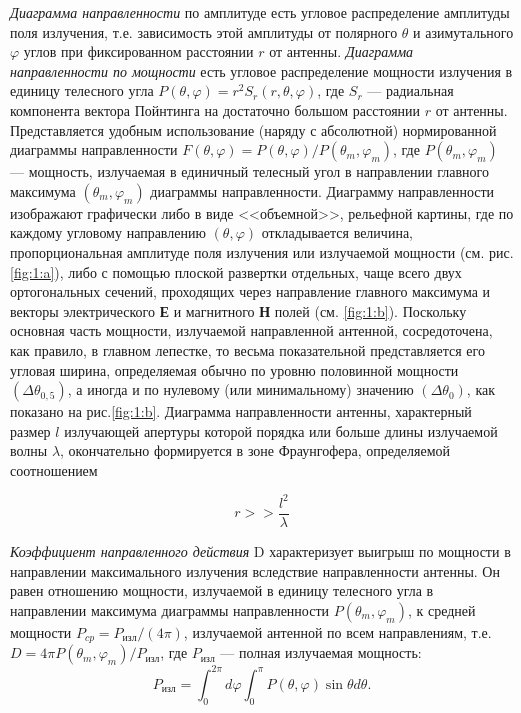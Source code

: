 \textit{Диаграмма направленности} по амплитуде есть угловое распределение амплитуды поля излучения, т.е. зависимость этой
амплитуды от полярного $\theta $ и азимутального $ \varphi $ углов при фиксированном расстоянии $r$ от антенны. \textit{Диаграмма направленности
по мощности} есть угловое распределение мощности излучения в единицу телесного угла $P(\theta, \varphi)=r^{2} S_{r}(r, \theta, \varphi)$,
где $S_{r}$ — радиальная компонента вектора Пойнтинга на достаточно большом расстоянии $r$ от антенны. Представляется 
удобным использование (наряду с абсолютной) нормированной диаграммы направленности $F(\theta,\varphi) = P(\theta,\varphi)/P(\theta_m,\varphi_m)$,
где $P(\theta_m,\varphi_m)$ — мощность, излучаемая в единичный телесный угол в направлении главного максимума $(\theta_m,\varphi_m)$ диаграммы
направленности. Диаграмму направленности изображают графически либо в виде <<объемной>>, рельефной картины, где по
каждому угловому направлению $(\theta,\varphi)$ откладывается величина, пропорциональная амплитуде поля излучения или излучаемой 
мощности (см. рис. \ref{fig:1:a}), либо с помощью плоской развертки отдельных, чаще всего двух ортогональных сечений, проходящих 
через направление главного максимума и векторы электрического \textbf{Е} и магнитного \textbf{Н} полей (см. \ref{fig:1:b}). Поскольку основная
часть мощности, излучаемой направленной антенной, сосредоточена, как правило, в главном лепестке, то весьма показательной
представляется его угловая ширина, определяемая обычно по уровню половинной мощности $ \left(\Delta \theta_{0,5}\right) $, а иногда и по нулевому (или минимальному) значению
$ \left(\Delta \theta_{0}\right) $, как показано на рис.\ref{fig:1:b}. Диаграмма направленности антенны, характерный размер $l$
излучающей апертуры которой порядка или больше длины излучаемой волны $\lambda$, окончательно формируется в зоне Фраунгофера,
определяемой соотношением 

\begin{equation}
    r>>\frac{l^2}{\lambda}
    \label{eq:1}
\end{equation}

\textit{Коэффициент направленного действия} D характеризует
выигрыш по  мощности в направлении максимального излучения вследствие направленности антенны. Он равен отношению 
мощности, излучаемой в единицу телесного угла в направлении максимума диаграммы направленности $P(\theta_m,\varphi_m)$, к средней 
мощности $P_{cp} = P_{\text{изл}} /(4\pi)$, излучаемой антенной по всем направлениям, т.е. $ D=4 \pi
P\left(\theta_{m}, \varphi_{m}\right) / P_{\text{изл}} $, где $P_{\text{изл}} $ — полная излучаемая мощность:
$$  P_{\text{изл}} = \int_0^{2\pi}d\varphi \int_0^\pi P( \theta,\varphi ) \sin{\theta}d \theta. $$

